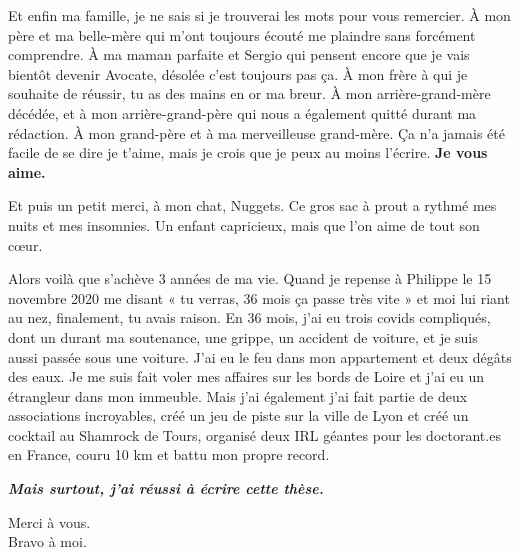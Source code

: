 \par Et enfin ma famille, je ne sais si je trouverai les mots pour vous remercier. À mon père et ma belle-mère qui m’ont toujours écouté me plaindre sans forcément comprendre. À ma maman parfaite et Sergio qui pensent encore que je vais bientôt devenir Avocate, désolée c'est toujours pas ça. À mon frère à qui je souhaite de réussir, tu as des mains en or ma breur. À mon arrière-grand-mère décédée, et à mon arrière-grand-père qui nous a également quitté durant ma rédaction. À mon grand-père et à ma merveilleuse grand-mère. Ça n’a jamais été facile de se dire je t’aime, mais je crois que je peux au moins l’écrire. \textbf{Je vous aime.} 
\par Et puis un petit merci, à mon chat, Nuggets. Ce gros sac à prout a rythmé mes nuits et mes insomnies. Un enfant capricieux, mais que l’on aime de tout son cœur. 
\par Alors voilà que s’achève 3 années de ma vie. Quand je repense à Philippe le 15 novembre 2020 me disant « tu verras, 36 mois ça passe très vite » et moi lui riant au nez, finalement, tu avais raison. En 36 mois, j’ai eu trois covids compliqués, dont un durant ma soutenance, une grippe, un accident de voiture, et je suis aussi passée sous une voiture. J’ai eu le feu dans mon appartement et deux dégâts des eaux. Je me suis fait voler mes affaires sur les bords de Loire et j’ai eu un étrangleur dans mon immeuble. Mais j’ai également j’ai fait partie de deux associations incroyables, créé un jeu de piste sur la ville de Lyon et créé un cocktail au Shamrock de Tours, organisé deux IRL géantes pour les doctorant.es en France, couru 10 km et battu mon propre record. 
\par\textbf{\textit{Mais surtout, j’ai réussi à écrire cette thèse.}}  


\begin{flushright}
Merci à vous.\\
Bravo à moi.
\end{flushright}
